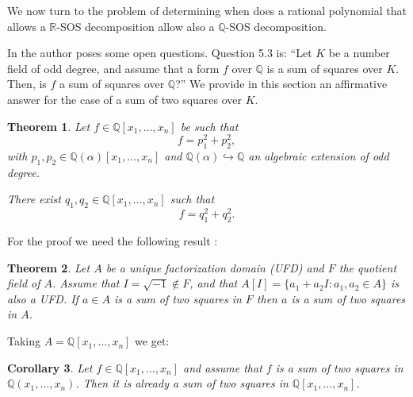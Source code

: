 \documentclass{amsart}
\newtheorem{theorem}{Theorem}[section]
\newtheorem{coro}[theorem]{Corollary}
\theoremstyle{definition}
\theoremstyle{remark}
\numberwithin{equation}{section}
\newcommand{\Q}{{\mathbb Q}}
\newcommand{\R}{{\mathbb R}}
\begin{document}
We now turn to the problem of determining when does a rational polynomial that allows a $\R$-SOS decomposition allow also a $\Q$-SOS decomposition.

In \cite[Section 5]{scheiderer} the author poses some open questions. Question 5.3 is: ``Let $K$ be a number field of odd degree, and assume that a form $f$ over $\Q$ is a sum of squares over $K$. Then, is $f$ a sum of squares over $\Q$?'' We provide in this section an affirmative answer for the case of a sum of two squares over $K$.

\begin{theorem}
\label{theorem:twopolys}
Let $f \in \Q[x_1, \dots, x_n]$ be such that
\[
f=p_1^2 + p_2^2,
\]
with $p_1, p_2 \in \Q(\alpha)[x_1, \dots, x_n]$ and $\Q(\alpha) \hookrightarrow \Q$ an algebraic extension of odd degree.

There exist $q_1, q_2 \in \Q[x_1, \dots, x_n]$ such that
\[
f= q_1^2 + q_2^2.
\]
\end{theorem}

For the proof we need the following result \cite[Theorem A]{choi}:
\begin{theorem}
\label{theoremA}
Let $A$ be a unique factorization domain (UFD) and $F$ the quotient field of $A$. Assume that $I = \sqrt{-1} \not\in F$, and that $A[I] = \{a_1 + a_2 I : a_1, a_2 \in A\}$ is also a UFD. If $a \in A$ is a sum of two squares in $F$ then $a$ is a sum of two squares in $A$.
\end{theorem}

Taking $A = \Q[x_1, \dots, x_n]$ we get:

\begin{coro}
\label{theoremC}
Let $f \in \Q[x_1, \dots, x_n]$ and assume that $f$ is a sum of two squares in $\Q(x_1, \dots, x_n)$. Then it is already a sum of two squares in $\Q[x_1, \dots, x_n]$.
\end{coro}
\end{document}
